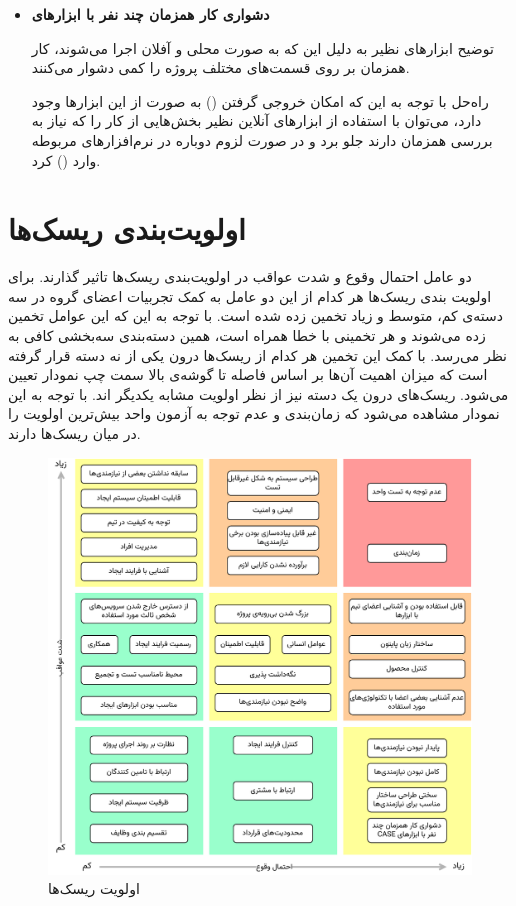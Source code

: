 \begin{itemize}
\item 
\textbf{دشواری کار همزمان چند نفر با ابزارهای }

توضیح \hspace*{1cm} 
ابزارهای  نظیر  به دلیل این که به صورت محلی و آفلان اجرا می‌شوند، کار همزمان بر روی قسمت‌های مختلف پروژه را کمی دشوار می‌کنند.

راه‌حل \hspace*{1cm} 
با توجه به این که امکان خروجی گرفتن () به صورت  از این ابزارها وجود دارد، می‌توان با استفاده از ابزارهای آنلاین نظیر  بخش‌هایی از کار را که نیاز به بررسی همزمان دارند جلو برد و در صورت لزوم دوباره در نرم‌افزارهای مربوطه وارد () کرد.
\end{itemize}


\section{اولویت‌بندی ریسک‌ها}

دو عامل احتمال وقوع و شدت عواقب در اولویت‌بندی ریسک‌ها تاثیر گذارند.
برای اولویت بندی ریسک‌ها هر کدام از این دو عامل به کمک تجربیات اعضای گروه در سه دسته‌ی کم، متوسط و زیاد تخمین زده شده است.
با توجه به این که این عوامل تخمین زده می‌شوند و هر تخمینی با خطا همراه است، همین دسته‌بندی سه‌بخشی کافی به نظر می‌رسد.
با کمک این تخمین هر کدام از ریسک‌ها درون یکی از نه دسته قرار گرفته است که میزان اهمیت آن‌ها بر اساس فاصله تا گوشه‌ی بالا سمت چپ نمودار تعیین می‌شود.
ریسک‌های درون یک دسته نیز از نظر اولویت مشابه یکدیگر اند.
با توجه به این نمودار مشاهده می‌شود که زمان‌بندی و عدم توجه به آزمون واحد بیش‌ترین اولویت را در میان ریسک‌ها دارند.

\begin{figure}[ht!]
	\centering
			\includegraphics[scale=0.8, page=1]{figs/risks.pdf}
	\caption{اولویت ریسک‌ها}
\end{figure}

